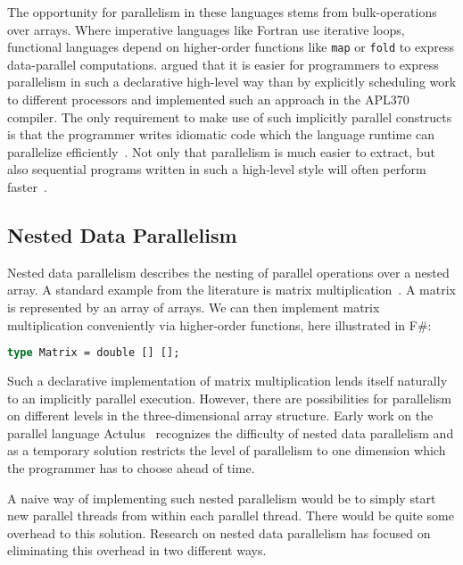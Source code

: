 \documentclass[a4paper]{article}
\begin{document}
The opportunity for parallelism in these languages stems from bulk-operations over arrays. Where imperative languages like Fortran use iterative loops, functional languages depend on higher-order functions like \texttt{map} or \texttt{fold} to express data-parallel computations. \citet{Ching:1990:APA:97808.97826} argued that it is easier for programmers to express parallelism in such a declarative high-level way than by explicitly scheduling work to different processors and implemented such an approach in the APL370 compiler. The only requirement to make use of such implicitly parallel constructs is that the programmer writes idiomatic code which the language runtime can parallelize efficiently~\cite{Bernecky:2015:AEP:2774959.2774962}. Not only that parallelism is much easier to extract, but also sequential programs written in such a high-level style will often perform faster~\cite{Bernecky:2015:AEP:2774959.2774962}.

\subsection{Nested Data Parallelism}
\label{sec:nest-data-parall}

Nested data parallelism describes the nesting of parallel operations over a nested array. A standard example from the literature is matrix multiplication~\cite{Keller:2010:RSP:1863543.1863582}. A matrix is represented by an array of arrays. We can then implement matrix multiplication conveniently via higher-order functions, here illustrated in F\#:

\begin{lstlisting}[language=ML]
type Matrix = double [] [];
\end{lstlisting}

Such a declarative implementation of matrix multiplication lends itself naturally to an implicitly parallel execution. However, there are possibilities for parallelism on different levels in the three-dimensional array structure. Early work on the parallel language Actulus~\cite{Perrott:1979:LAV:357073.357075} recognizes the difficulty of nested data parallelism and as a temporary solution restricts the level of parallelism to one dimension which the programmer has to choose ahead of time.

A naive way of implementing such nested parallelism would be to simply start new parallel threads from within each parallel thread. There would be quite some overhead to this solution. Research on nested data parallelism has focused on eliminating this overhead in two different ways.
\end{document}
